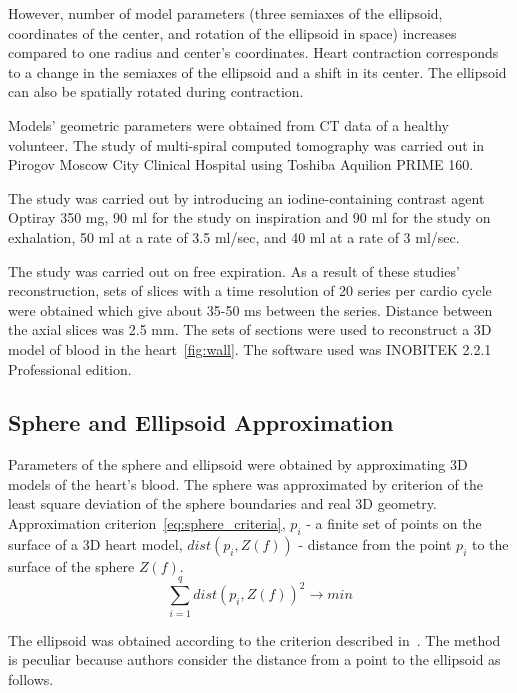 \documentclass[conference]{IEEEtran}
\begin{document}
However, number of model parameters (three semiaxes of the ellipsoid, coordinates of the center, and rotation of the ellipsoid in space) increases compared to one radius and center’s coordinates.
Heart contraction corresponds to a change in the semiaxes of the ellipsoid and a shift in its center.
The ellipsoid can also be spatially rotated during contraction.

Models’ geometric parameters were obtained from CT data of a healthy volunteer.
The study of multi-spiral computed tomography was carried out in Pirogov Moscow City Clinical Hospital using Toshiba Aquilion PRIME 160.

The study was carried out by introducing an iodine-containing contrast
agent Optiray 350 mg, 90 ml for the study on inspiration and 90 ml for the study
on exhalation, 50 ml at a rate of 3.5 ml/sec, and 40 ml at a rate of 3 ml/sec.

The study was carried out on free expiration.
As a result of these studies’ reconstruction, sets of slices with a time resolution of 20 series per cardio cycle were obtained which give about 35-50 ms between the series.
Distance between the axial slices was 2.5 mm.
The sets of sections were used to reconstruct a 3D model of blood in the heart~\ref{fig:wall}.
The software used was INOBITEK 2.2.1 Professional edition.

\subsection{Sphere and Ellipsoid Approximation}

Parameters of the sphere and ellipsoid were obtained by approximating 3D models of the heart’s blood.
The sphere was approximated by criterion of the least square deviation of the sphere boundaries and real 3D geometry.
Approximation criterion~\ref{eq:sphere_criteria},
$p_i$ - a finite set of points on the surface of a 3D heart model,
$dist(p_i,Z(f))$ -  distance from the point $p_i$ to the surface of the sphere $Z(f)$.
\begin{equation}
    \sum_{i=1}^{q}dist(p_i,Z(f))^2 \rightarrow min
    \label{eq:sphere_criteria}
\end{equation}

The ellipsoid was obtained according to the criterion described in~\cite{Bookstein1979}.
The method is peculiar because authors consider the distance from a point to the ellipsoid as follows.
\end{document}
